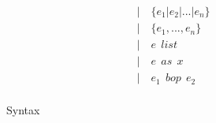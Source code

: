 \begin{figure}[!ht]
\begin{minipage}{0.4\columnwidth}
\begin{align*}
|~& \{e_1 | e_2 | ... | e_n\} \tag{union}\label{syntax:union}\\
|~& \{e_1, ..., e_n\} \tag{struct}\label{syntax:struct}\\
|~& e ~~ list \tag{list}\label{syntax:list}\\
|~& e ~~ as ~~ x \tag{blinding}\label{syntax:blinding}\\
|~& e_1 ~~ bop ~~ e_2 \tag{binary operation}\label{syntax:bop}\\
\end{align*}
\end{minipage}
\caption{Syntax}
\label{fig:syntax}
\end{figure}

